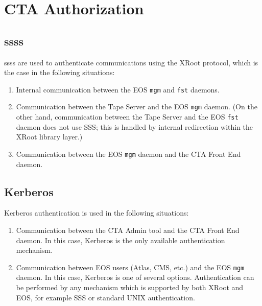 \chapter{CTA Authorization}

\section{\glspl{sss}}

\glspl{sss} are used to authenticate communications using the XRoot protocol, which is the case in the following
situations:
\begin{enumerate}
\item Internal communication between the EOS \texttt{mgm} and \texttt{fst} daemons.
\item Communication between the Tape Server and the EOS \texttt{mgm} daemon. (On the other hand, communication between
the Tape Server and the EOS \texttt{fst} daemon does not use SSS; this is handled by internal redirection within the
XRoot library layer.)
\item Communication between the EOS \texttt{mgm} daemon and the CTA Front End daemon.
\end{enumerate}

\section{Kerberos}

Kerberos authentication is used in the following situations:
\begin{enumerate}
\item Communication between the CTA Admin tool and the CTA Front End daemon. In this case, Kerberos is the only available
authentication mechanism.
\item Communication between EOS users (Atlas, CMS, etc.) and the EOS \texttt{mgm} daemon. In this case, Kerberos is one
of several options. Authentication can be performed by any mechanism which is supported by both XRoot and EOS, for
example SSS or standard UNIX authentication.
\end{enumerate}

